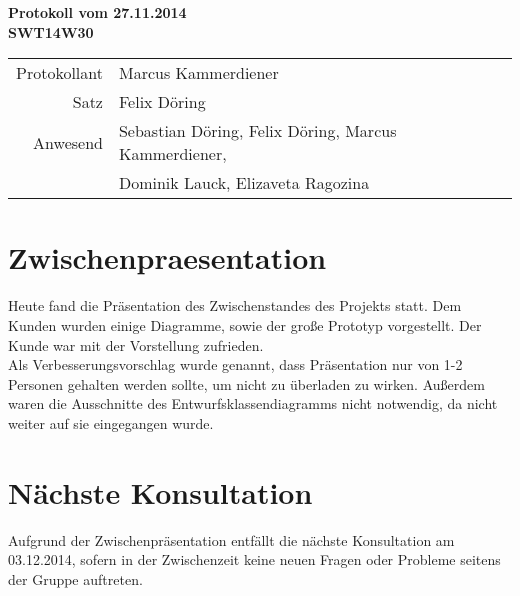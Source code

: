 \documentclass{scrartcl}
\begin{document}
\begin{center}
\LARGE \bf{Protokoll vom 27.11.2014 \\
SWT14W30}
\end{center}

\begin{tabular}{rp{10cm}}
Protokollant & Marcus Kammerdiener \\
Satz & Felix Döring \\
Anwesend & Sebastian Döring, Felix Döring, Marcus Kammerdiener,\\
& Dominik Lauck, Elizaveta Ragozina \\
\end{tabular}

\vspace*{3em}

\section{Zwischenpraesentation}
Heute fand die Präsentation des Zwischenstandes des Projekts statt. Dem Kunden wurden einige Diagramme, sowie
der große Prototyp vorgestellt. Der Kunde war mit der Vorstellung zufrieden.\\
Als Verbesserungsvorschlag wurde genannt, dass Präsentation nur von 1-2 Personen gehalten werden sollte, um nicht zu überladen zu wirken. Außerdem waren die Ausschnitte des Entwurfsklassendiagramms nicht notwendig, da nicht weiter auf sie eingegangen wurde. 


\vspace*{1em}

\section{N\"achste Konsultation}
Aufgrund der Zwischenpräsentation entfällt die nächste Konsultation am 03.12.2014, sofern in der Zwischenzeit keine neuen Fragen oder Probleme seitens der Gruppe auftreten.
\end{document}
